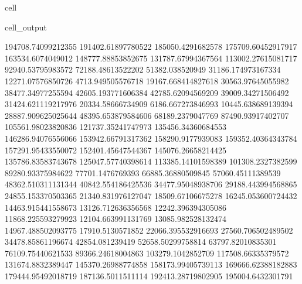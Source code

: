 \documentclass[letterpaper,10pt,english]{jupyterBook}
\begin{document}
\begin{sphinxuseclass}{cell}
\begin{sphinxVerbatimOutput}
\begin{sphinxuseclass}{cell_output}
\begin{sphinxVerbatim}[commandchars=\\\{\}]
194708.74099212355  191402.61897780522  185050.4291682578  175709.60452917917  163534.6074049012  148777.88853852675  131787.67994367564  113002.27615081717  92940.53795983572  72188.48613522202  51382.038520949  31186.174973167334  12271.07576850726  \PYGZhy{}4713.949505576718  \PYGZhy{}19167.668414827618  \PYGZhy{}30563.97645055982  \PYGZhy{}38477.34977255594  \PYGZhy{}42605.193771606384  \PYGZhy{}42785.62094569209  \PYGZhy{}39009.34271506492  \PYGZhy{}31424.621119217976  \PYGZhy{}20334.58666734909  \PYGZhy{}6186.667273846993  10445.638689139394  28887.909625025644  48395.653879584606  68189.2379047769  87490.93917402707  105561.98023820836  121737.35241747973  135456.34360684553  146286.94076556066  153942.66791317362  158290.9177939083  159352.40364343784  157291.95433550072  152401.45647544367  145076.26658214425  135786.83583743678  125047.57740398614  113385.14101598389  101308.2327382599  89280.93375984622  77701.1476769393  66885.36880509845  57060.45111389539  48362.510311131344  40842.554186425536  34477.95048938706  29188.443994568865  24855.153370503365  21340.831976127047  18509.67106675278  16245.053600724432  14463.915441558673  13126.712636356568  12242.396394305086  11868.225593279923  12104.663991131769  13085.982528132474  14967.488502093775  17910.5130571852  22066.395532916693  27560.706502489502  34478.85861196674  42854.081239419  52658.50299758814  63797.82010835301  76109.75440621533  89366.24618004863  103279.1042852709  117508.66335379572  131674.8832389447  145370.26988774858  158173.99405739113  169666.62388182883  179444.95492018719  187136.5011511114  192413.28719802905  195004.6432301791  

\end{sphinxVerbatim}
\end{sphinxuseclass}
\end{sphinxVerbatimOutput}
\end{sphinxuseclass}
\end{document}
